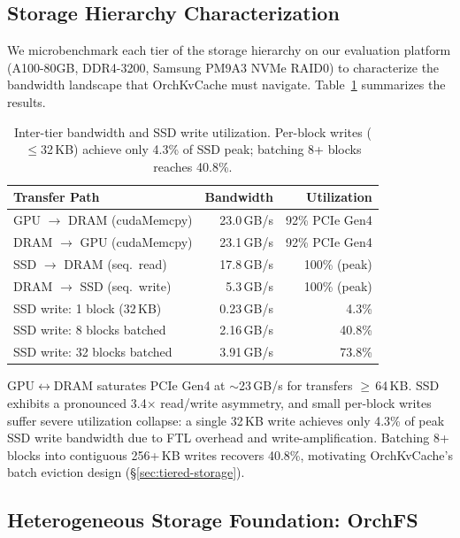 \documentclass[conference]{IEEEtran}
\begin{document}
\subsection{Storage Hierarchy Characterization}
\label{sec:storage-char}

We microbenchmark each tier of the storage hierarchy on our evaluation platform (A100-80GB, DDR4-3200, Samsung PM9A3 NVMe RAID0) to characterize the bandwidth landscape that OrchKvCache must navigate. Table~\ref{tab:storage-char} summarizes the results.

\begin{table}[t]
\centering
\caption{Inter-tier bandwidth and SSD write utilization. Per-block writes ($\leq$32\,KB) achieve only 4.3\% of SSD peak; batching 8+ blocks reaches 40.8\%.}
\label{tab:storage-char}
\small
\begin{tabular}{@{}lrr@{}}
\toprule
Transfer Path & Bandwidth & Utilization \\
\midrule
GPU $\to$ DRAM (cudaMemcpy) & 23.0\,GB/s & 92\% PCIe Gen4 \\
DRAM $\to$ GPU (cudaMemcpy) & 23.1\,GB/s & 92\% PCIe Gen4 \\
SSD $\to$ DRAM (seq.\ read)  & 17.8\,GB/s & 100\% (peak) \\
DRAM $\to$ SSD (seq.\ write) & 5.3\,GB/s & 100\% (peak) \\
\midrule
SSD write: 1 block (32\,KB)  & 0.23\,GB/s & 4.3\% \\
SSD write: 8 blocks batched  & 2.16\,GB/s & 40.8\% \\
SSD write: 32 blocks batched & 3.91\,GB/s & 73.8\% \\
\bottomrule
\end{tabular}
\end{table}

GPU$\leftrightarrow$DRAM saturates PCIe Gen4 at ${\sim}$23\,GB/s for transfers $\geq$\,64\,KB. SSD exhibits a pronounced 3.4$\times$ read/write asymmetry, and small per-block writes suffer severe utilization collapse: a single 32\,KB write achieves only 4.3\% of peak SSD write bandwidth due to FTL overhead and write-amplification. Batching 8+ blocks into contiguous 256+\,KB writes recovers 40.8\%, motivating OrchKvCache's batch eviction design (\S\ref{sec:tiered-storage}).

\subsection{Heterogeneous Storage Foundation: OrchFS}
\end{document}
